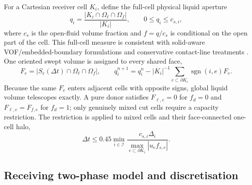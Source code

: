 \documentclass[11pt]{article}
\begin{document}
For a Cartesian receiver cell $K_i$, define the full-cell physical liquid
aperture
\begin{equation}
q_i=\frac{|K_i\cap\Omega_\ell\cap\Omega_f|}{|K_i|},
\qquad 0\le q_i\le c_{s,i},
\label{eq:q-definition}
\end{equation}
where $c_s$ is the open-fluid volume fraction and $f=q/c_s$ is conditional on
the open part of the cell.  This full-cell measure is consistent with
solid-aware VOF/embedded-boundary formulations and conservative contact-line
treatments \cite{TavaresEtAl2024,ChenEtAl2025,HuangEtAl2025,HuangEtAl2026}.
One oriented swept volume is assigned to every
shared face,
\begin{equation}
F_e=|S_e(\Delta t)\cap\Omega_\ell\cap\Omega_f|,
\qquad
q_i^{n+1}=q_i^n-|K_i|^{-1}
\sum_{e\subset\partial K_i}\operatorname{sgn}(i,e)F_e.
\label{eq:q-flux}
\end{equation}
Because the same $F_e$ enters adjacent cells with opposite signs, global
liquid volume telescopes exactly.  A pure donor satisfies
$F_{\ell,e}=0$ for $f_d=0$ and $F_{\ell,e}=F_{f,e}$ for $f_d=1$; only genuinely
mixed cut cells require a capacity restriction.  The restriction is applied
to mixed cells and their face-connected one-cell halo,
\begin{equation}
\Delta t\le0.45\min_{i\in\mathcal I}
\frac{c_{s,i}\Delta_i}
{\max_{e\subset\partial K_i}|u_e f_{s,e}|}.
\label{eq:cut-cell-step}
\end{equation}

\subsection{Receiving two-phase model and discretisation}
\end{document}

